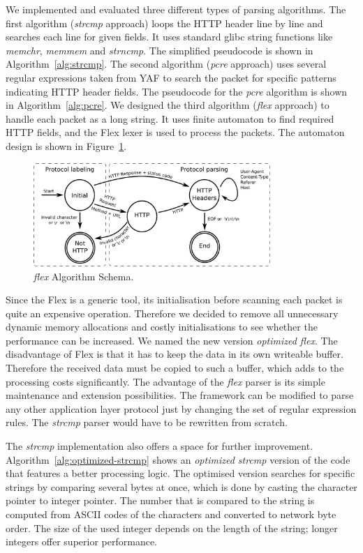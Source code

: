 We implemented and evaluated three different types of parsing algorithms. The first algorithm (\emph{strcmp} approach) loops the HTTP header line by line and searches each line for given fields. It uses standard glibc string functions like \emph{memchr}, \emph{memmem} and \emph{strncmp}. The simplified pseudocode is shown in Algorithm~\ref{alg:strcmp}. The second algorithm (\emph{pcre} approach) uses several regular expressions taken from YAF to search the packet for specific patterns indicating HTTP header fields. The pseudocode for the \emph{pcre} algorithm is shown in Algorithm~\ref{alg:pcre}. We designed the third algorithm (\emph{flex} approach) to handle each packet as a long string. It uses finite automaton to find required HTTP fields, and the Flex lexer is used to process the packets. The automaton design is shown in Figure~\ref{fig:flex_schema}.

\begin{figure}[t]
        \centering
        \includegraphics[width=0.8\textwidth]{figures/paper-http/flex_schema}
        \caption{\emph{flex} Algorithm Schema.}
        \label{fig:flex_schema}
\end{figure}

Since the Flex is a generic tool, its initialisation before scanning each packet is quite an expensive operation. Therefore we decided to remove all unnecessary dynamic memory allocations and costly initialisations to see whether the performance can be increased. We named the new version \emph{optimized flex}. The disadvantage of Flex is that it has to keep the data in its own writeable buffer. Therefore the received data must be copied to such a buffer, which adds to the processing costs significantly. The advantage of the \emph{flex} parser is its simple maintenance and extension possibilities. The framework can be modified to parse any other application layer protocol just by changing the set of regular expression rules. The \emph{strcmp} parser would have to be rewritten from scratch.

The \emph{strcmp} implementation also offers a space for further improvement. Algorithm~\ref{alg:optimized-strcmp} shows an \emph{optimized strcmp} version of the code that features a better processing logic. The optimised version searches for specific strings by comparing several bytes at once, which is done by casting the character pointer to integer pointer. The number that is compared to the string is computed from ASCII codes of the characters and converted to network byte order. The size of the used integer depends on the length of the string; longer integers offer superior performance.


